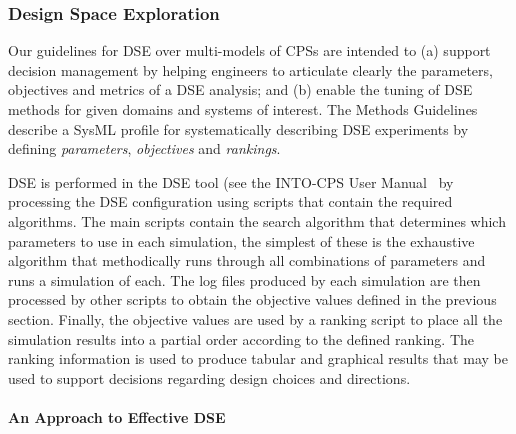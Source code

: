 \subsubsection{Design Space Exploration}
\label{sec:method:dse}

Our guidelines for DSE over multi-models of CPSs are intended to (a) support decision management by helping engineers to articulate clearly the parameters, objectives and metrics of a DSE analysis; and (b) enable the tuning of DSE methods for given domains and systems of interest. The Methods Guidelines~\cite{Pierce&18} describe a SysML profile for systematically describing DSE experiments by defining \emph{parameters}, \emph{objectives} and \emph{rankings}.

DSE is performed in the DSE tool (see the INTO-CPS User Manual~\cite{Larsen&18a} by processing the DSE configuration using scripts that contain the required algorithms.  The main scripts contain the search algorithm that determines which parameters to use in each simulation, the simplest of these is the exhaustive algorithm that methodically runs through all combinations of parameters and runs a simulation of each.  The log files produced by each simulation are then processed by other scripts to obtain the objective values defined in the previous section.  Finally, the objective values are used by a ranking script to place all the simulation results into a partial order according to the defined ranking.  The ranking information is used to produce tabular and graphical results that may be used to support decisions regarding design choices and directions.

%

\paragraph{An Approach to Effective DSE}
\label{sec:dse-algorithms}

